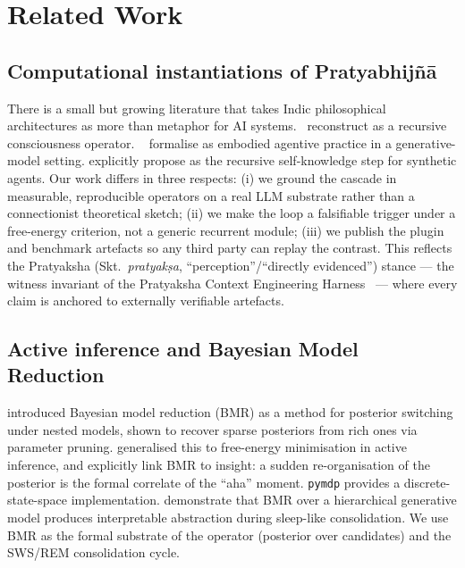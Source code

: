\section{Related Work}\label{sec:related}

\subsection{Computational instantiations of Pratyabhij\~n\=a}

There is a small but growing literature that takes Indic philosophical architectures as more than metaphor for AI systems.~\citet{RatieFlamandLeavitt2025} reconstruct  as a recursive consciousness operator. ~\citet{NambhatraDahlquist2025} formalise  as embodied agentive practice in a generative-model setting. \citet{CONNECTOM2024,Suriya2025VimarsaConsciousness} explicitly propose  as the recursive self-knowledge step for synthetic agents. Our work differs in three respects: (i) we ground the cascade in measurable, reproducible operators on a real LLM substrate rather than a connectionist theoretical sketch; (ii) we make the  loop a falsifiable trigger under a free-energy criterion, not a generic recurrent module; (iii) we publish the plugin and benchmark artefacts so any third party can replay the contrast. This reflects the Pratyaksha (Skt.\ \emph{pratyak\d{s}a}, ``perception''/``directly evidenced'') stance --- the witness invariant of the Pratyaksha Context Engineering Harness~\citep{PratyakshaContextEng2025} --- where every claim is anchored to externally verifiable artefacts.

\subsection{Active inference and Bayesian Model Reduction}

\citet{FristonPenny2011} introduced Bayesian model reduction (BMR) as a method for posterior switching under nested models, shown to recover sparse posteriors from rich ones via parameter pruning. \citet{Friston2018BayesianModelReductionArxiv} generalised this to free-energy minimisation in active inference, and \citet{Friston2017ActiveInferenceCuriosity} explicitly link BMR to insight: a sudden re-organisation of the posterior is the formal correlate of the ``aha'' moment. \texttt{pymdp} \citep{Heins2022pymdp} provides a discrete-state-space implementation. \citet{vanDeMaele2024NeurIPS} demonstrate that BMR over a hierarchical generative model produces interpretable abstraction during sleep-like consolidation. We use BMR as the formal substrate of the  operator (posterior over candidates) and the SWS/REM consolidation cycle.

